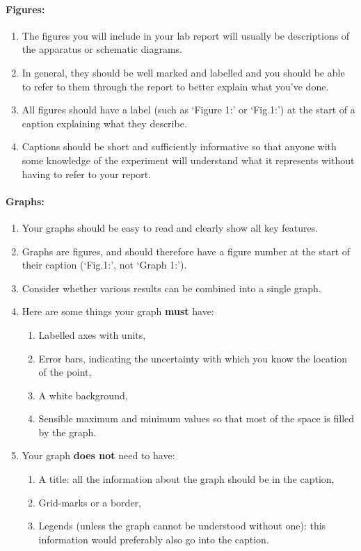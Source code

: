 \paragraph{Figures:} 
\begin{enumerate}
    \item The figures you will include in your lab report will usually be descriptions of the apparatus or schematic diagrams. 
    \item In general, they should be well marked and labelled and you should be able to refer to them through the report to better explain what you've done. 
    \item All figures should have a label (such as `Figure 1:' or `Fig.1:') at the start of a caption explaining what they describe. 
    \item Captions should be short and sufficiently informative so that anyone with some knowledge of the experiment will understand what it represents without having to refer to your report.
\end{enumerate}

\paragraph{Graphs:}
\begin{enumerate}
    \item Your graphs should be easy to read and clearly show all key features.
    \item Graphs are figures, and should therefore have a figure number at the start of their caption (`Fig.1:', not `Graph 1:').
    \item Consider whether various results can be combined into a single graph.
    \item Here are some things your graph \textbf{must} have:
    
    \begin{enumerate}
        \item Labelled axes with units,
        \item Error bars, indicating the uncertainty with which you know the location of the point,
        \item A white background,
        \item Sensible maximum and minimum values so that most of the space is filled by the graph.
    \end{enumerate}
    
    \item Your graph \textbf{does not} need to have:
    
    \begin{enumerate}
        \item A title: all the information about the graph should be in the caption,
        \item Grid-marks or a border,
        \item Legends (unless the graph cannot be understood without one): this information would preferably also go into the caption.
    \end{enumerate}

\end{enumerate}


